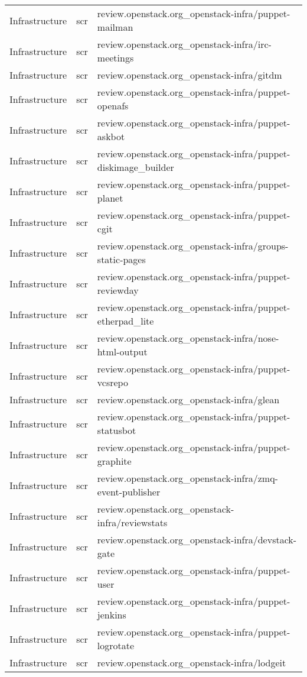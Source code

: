 \begin{center}
\begin{longtable}{|p{4cm}|p{1cm}|p{10cm}|}
Infrastructure&scr&review.openstack.org\_openstack-infra/puppet-mailman\\ 
Infrastructure&scr&review.openstack.org\_openstack-infra/irc-meetings\\ 
Infrastructure&scr&review.openstack.org\_openstack-infra/gitdm\\ 
Infrastructure&scr&review.openstack.org\_openstack-infra/puppet-openafs\\ 
Infrastructure&scr&review.openstack.org\_openstack-infra/puppet-askbot\\ 
Infrastructure&scr&review.openstack.org\_openstack-infra/puppet-diskimage\_builder\\ 
Infrastructure&scr&review.openstack.org\_openstack-infra/puppet-planet\\ 
Infrastructure&scr&review.openstack.org\_openstack-infra/puppet-cgit\\ 
Infrastructure&scr&review.openstack.org\_openstack-infra/groups-static-pages\\ 
Infrastructure&scr&review.openstack.org\_openstack-infra/puppet-reviewday\\ 
Infrastructure&scr&review.openstack.org\_openstack-infra/puppet-etherpad\_lite\\ 
Infrastructure&scr&review.openstack.org\_openstack-infra/nose-html-output\\ 
Infrastructure&scr&review.openstack.org\_openstack-infra/puppet-vcsrepo\\ 
Infrastructure&scr&review.openstack.org\_openstack-infra/glean\\ 
Infrastructure&scr&review.openstack.org\_openstack-infra/puppet-statusbot\\ 
Infrastructure&scr&review.openstack.org\_openstack-infra/puppet-graphite\\ 
Infrastructure&scr&review.openstack.org\_openstack-infra/zmq-event-publisher\\ 
Infrastructure&scr&review.openstack.org\_openstack-infra/reviewstats\\ 
Infrastructure&scr&review.openstack.org\_openstack-infra/devstack-gate\\ 
Infrastructure&scr&review.openstack.org\_openstack-infra/puppet-user\\ 
Infrastructure&scr&review.openstack.org\_openstack-infra/puppet-jenkins\\ 
Infrastructure&scr&review.openstack.org\_openstack-infra/puppet-logrotate\\ 
Infrastructure&scr&review.openstack.org\_openstack-infra/lodgeit\\ 

\end{longtable}
\end{center}
